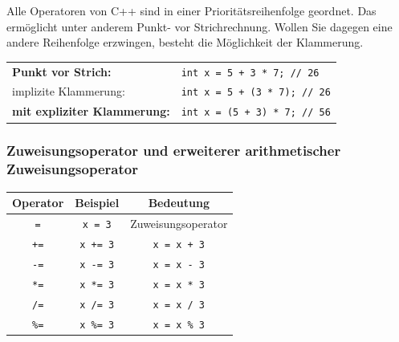 \documentclass[a4paper]{report}
\begin{document}
Alle Operatoren von C++ sind in einer Prioritätsreihenfolge geordnet. Das ermöglicht unter anderem Punkt- vor Strichrechnung. Wollen Sie dagegen eine andere Reihenfolge erzwingen, besteht die Möglichkeit der Klammerung. %
\begin{center}
	\begin{tabular}{|l|l|} \hline
		\textbf{Punkt vor Strich:} & \texttt{int x = 5 + 3 * 7; // 26} \\
		\quad implizite Klammerung: & \texttt{int x = 5 + (3 * 7); // 26} \\ \hline
		\textbf{mit expliziter Klammerung:} & \texttt{int x = (5 + 3) * 7; // 56} \\ \hline
	\end{tabular}
\end{center}

\subsubsection{Zuweisungsoperator und erweiterer arithmetischer Zuweisungsoperator}
\begin{center}
	\begin{tabular}{|c|c|c|} \hline
		\textbf{Operator} &	\textbf{Beispiel} & \textbf{Bedeutung} \\ \hline
		\texttt{=} & \texttt{x = 3} & Zuweisungsoperator \\ \hline
		\texttt{+=} & \texttt{x += 3} & \texttt{x = x + 3} \\ \hline
		\texttt{-=} & \texttt{x -= 3} & \texttt{x = x - 3} \\ \hline
		\texttt{*=} & \texttt{x *= 3} & \texttt{x = x * 3} \\ \hline
		\texttt{/=} & \texttt{x /= 3} & \texttt{x = x / 3} \\ \hline
		\texttt{\%=} & \texttt{x \%= 3} & \texttt{x = x \% 3} \\ \hline	

	\end{tabular}
\end{center}

\end{document}
